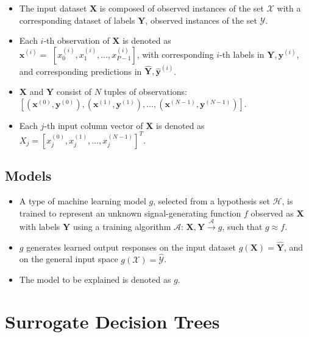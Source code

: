 \documentclass[sigconf]{acmart}
\begin{document}
	\begin{itemize}
		\item The input dataset $\mathbf{X}$ is composed of observed instances of the set $\mathcal{X}$ with a corresponding dataset of labels $\mathbf{Y}$, observed instances of the set $\mathcal{Y}$. 
		\item Each $i$-th observation of $\mathbf{X}$ is denoted as\\ $\mathbf{x}^{(i)} = $  
		$[x_0^{(i)}, x_1^{(i)}, \dots, x_{\textit{P}-1}^{(i)}]$, with corresponding $i$-th labels in $\mathbf{Y}, \mathbf{y}^{(i)}$, and corresponding predictions in $\mathbf{\hat{Y}}, \mathbf{\hat{y}}^{(i)}$. %
		\item $\mathbf{X}$ and $\mathbf{Y}$ consist of $N$ tuples of observations:\\ $[(\mathbf{x}^{(0)},\mathbf{y}^{(0)}), (\mathbf{x}^{(1)},\mathbf{y}^{(1)}), \dots,(\mathbf{x}^{(N-1)},\mathbf{y}^{(N-1)})]$. %
		\item Each $j$-th input column vector of $\mathbf{X}$ is denoted as $X_j = [x_{j}^{(0)}, x_{j}^{(1)}, \dots, x_{j}^{(N-1)}]^T$.
	\end{itemize}	 

\subsection{Models}

	\begin{itemize}
		\item A type of machine learning model $g$, selected from a hypothesis set $\mathcal{H}$, is trained to represent an unknown signal-generating function $f$ observed as  $\mathbf{X}$ with labels $\mathbf{Y}$ using a training algorithm $\mathcal{A}$: 
		$ \mathbf{X}, \mathbf{Y} \xrightarrow{\mathcal{A}} g$, such that $g \approx f$.
		\item $g$ generates learned output responses on the input dataset $g(\mathbf{X}) = \mathbf{\hat{Y}}$, and on the general input space $g(\mathcal{X}) = \mathcal{\hat{Y}}$.
		\item The model to be explained is denoted as $g$.
	\end{itemize}

\section{Surrogate Decision Trees} \label{sec:surrogate_dt}
\end{document}
